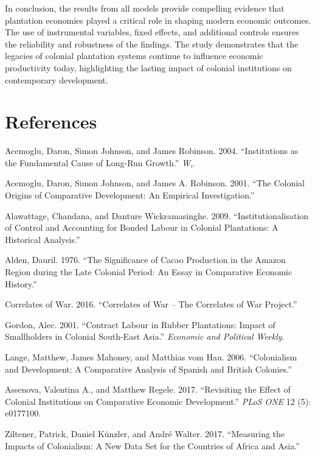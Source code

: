 \documentclass[12pt]{article}
\begin{document}
\noindent In conclusion, the results from all models provide compelling evidence that plantation economies played a critical role in shaping modern economic outcomes. The use of instrumental variables, fixed effects, and additional controls ensures the reliability and robustness of the findings. The study demonstrates that the legacies of colonial plantation systems continue to influence economic productivity today, highlighting the lasting impact of colonial institutions on contemporary development.

\newpage

\section{References}
\begin{thebibliography}{99}

Acemoglu, Daron, Simon Johnson, and James Robinson. 2004. “Institutions as the Fundamental Cause of Long-Run Growth.” \textit{W},.

Acemoglu, Daron, Simon Johnson, and James A. Robinson. 2001. “The Colonial Origins of Comparative Development: An Empirical Investigation.” 

Alawattage, Chandana, and Danture Wickramasinghe. 2009. “Institutionalisation of Control and Accounting for Bonded Labour in Colonial Plantations: A Historical Analysis.”

Alden, Dauril. 1976. “The Significance of Cacao Production in the Amazon Region during the Late Colonial Period: An Essay in Comparative Economic History.”

Correlates of War. 2016. “Correlates of War – The Correlates of War Project.”

Gordon, Alec. 2001. “Contract Labour in Rubber Plantations: Impact of Smallholders in Colonial South-East Asia.” \textit{Economic and Political Weekly}.

Lange, Matthew, James Mahoney, and Matthias vom Hau. 2006. “Colonialism and Development: A Comparative Analysis of Spanish and British Colonies.”

Assenova, Valentina A., and Matthew Regele. 2017. “Revisiting the Effect of Colonial Institutions on Comparative Economic Development.” \textit{PLoS ONE} 12 (5): e0177100. 

Ziltener, Patrick, Daniel Künzler, and André Walter. 2017. “Measuring the Impacts of Colonialism: A New Data Set for the Countries of Africa and Asia.”


\end{thebibliography}
\end{document}
